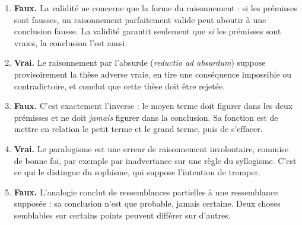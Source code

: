 \documentclass[11pt]{article}
\begin{document}
\begin{corrige}
\begin{enumerate}
\item \textbf{Faux.} La validité ne concerne que la forme du raisonnement : si les prémisses sont fausses, un raisonnement parfaitement valide peut aboutir à une conclusion fausse. La validité garantit seulement que \emph{si} les prémisses sont vraies, la conclusion l'est aussi.
\item \textbf{Vrai.} Le raisonnement par l'absurde (\emph{reductio ad absurdum}) suppose provisoirement la thèse adverse vraie, en tire une conséquence impossible ou contradictoire, et conclut que cette thèse doit être rejetée.
\item \textbf{Faux.} C'est exactement l'inverse : le moyen terme doit figurer dans les deux prémisses et ne doit \emph{jamais} figurer dans la conclusion. Sa fonction est de mettre en relation le petit terme et le grand terme, puis de s'effacer.
\item \textbf{Vrai.} Le paralogisme est une erreur de raisonnement involontaire, commise de bonne foi, par exemple par inadvertance sur une règle du syllogisme. C'est ce qui le distingue du sophisme, qui suppose l'intention de tromper.
\item \textbf{Faux.} L'analogie conclut de ressemblances partielles à une ressemblance supposée : sa conclusion n'est que probable, jamais certaine. Deux choses semblables sur certains points peuvent différer sur d'autres.
\end{enumerate}
\end{corrige}
\end{document}
